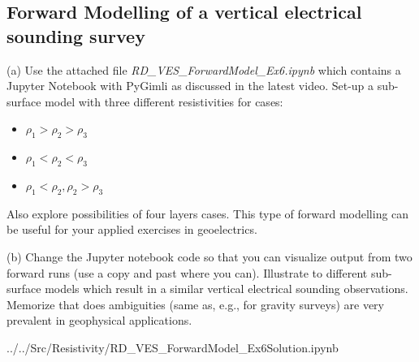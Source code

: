 \subsection{Forward Modelling of a vertical electrical sounding survey}
(a) Use the attached file \textit{RD\_VES\_ForwardModel\_Ex6.ipynb} which contains a Jupyter Notebook with PyGimli as discussed in the latest video. Set-up a sub-surface model with three different resistivities for cases:
\begin{itemize}
    \item $ \rho_1 > \rho_2 > \rho_3$
    \item $ \rho_1 < \rho_2 < \rho_3$
    \item $ \rho_1 < \rho_2, \rho_2 > \rho_3$
\end{itemize}
Also explore possibilities of four layers cases. This type of forward modelling can be useful for your applied exercises in geoelectrics.

(b) Change the Jupyter notebook code so that you can visualize output from two forward runs (use a copy and past where you can). Illustrate to different sub-surface models which result in a similar vertical electrical sounding observations. Memorize that does ambiguities (same as, e.g., for gravity surveys) are very prevalent in geophysical applications.
\ifanswers
    \begin{tcolorbox}[enhanced jigsaw,breakable,pad at break*=1mm,
    colback=blue!5!white,colframe=babyblueeyes,title=Solutions,
    watermark color=white]
    ../../Src/Resistivity/RD\_VES\_ForwardModel\_Ex6Solution.ipynb
    \end{tcolorbox}
\fi